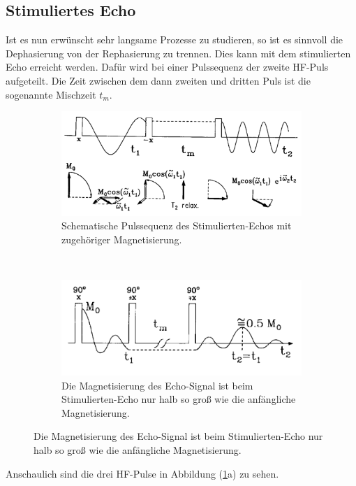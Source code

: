\subsection{Stimuliertes Echo}
Ist es nun erw\"{u}nscht sehr langsame Prozesse zu studieren, so ist es sinnvoll die Dephasie{\-}rung von der Rephasierung zu trennen.
Dies kann mit dem stimulierten Echo erreicht werden.
Daf\"{u}r wird bei einer Pulssequenz der zweite HF-Puls aufgeteilt.
Die Zeit zwischen dem dann zweiten und dritten Puls ist die sogenannte Mischzeit $t_m$.
\begin{figure}
\centering
\caption{Stimuliertes-Echo.}
\vspace{+5pt}
	\begin{subfigure}[t]{0.4\textwidth}
		\includegraphics[width=\textwidth]{Plots/stimuliertesecho.png}
		\caption{Schematische Pulssequenz des Stimulierten-Echos mit zugeh\"{o}riger Magnetisierung.}
	\end{subfigure}
	~
	\begin{subfigure}[t]{0.4\textwidth}
		\includegraphics[width=\textwidth]{Plots/stimuliertesecho2.png}
		\caption{Die Magnetisierung des Echo-Signal ist beim Stimulierten-Echo nur halb so gro{\ss} wie die anf\"{a}ngliche Magnetisierung.}
	\end{subfigure}
\label{stimEcho.}
\end{figure}
Anschaulich sind die drei HF-Pulse in Abbildung (\ref{stimEcho.}a) zu sehen.
